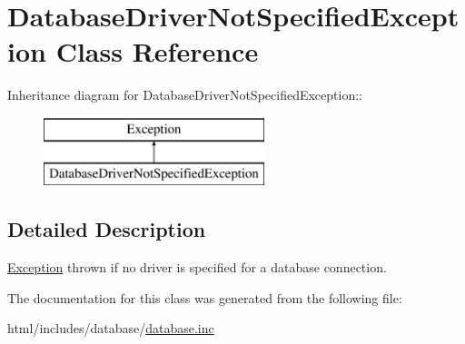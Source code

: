 \hypertarget{classDatabaseDriverNotSpecifiedException}{
\section{DatabaseDriverNotSpecifiedException Class Reference}
\label{classDatabaseDriverNotSpecifiedException}
}
Inheritance diagram for DatabaseDriverNotSpecifiedException::\begin{figure}[H]
\begin{center}
\leavevmode
\includegraphics[height=2cm]{classDatabaseDriverNotSpecifiedException}
\end{center}
\end{figure}


\subsection{Detailed Description}
\hyperlink{classException}{Exception} thrown if no driver is specified for a database connection. 

The documentation for this class was generated from the following file:\begin{DoxyCompactItemize}
\item 
html/includes/database/\hyperlink{database_8inc}{database.inc}\end{DoxyCompactItemize}
